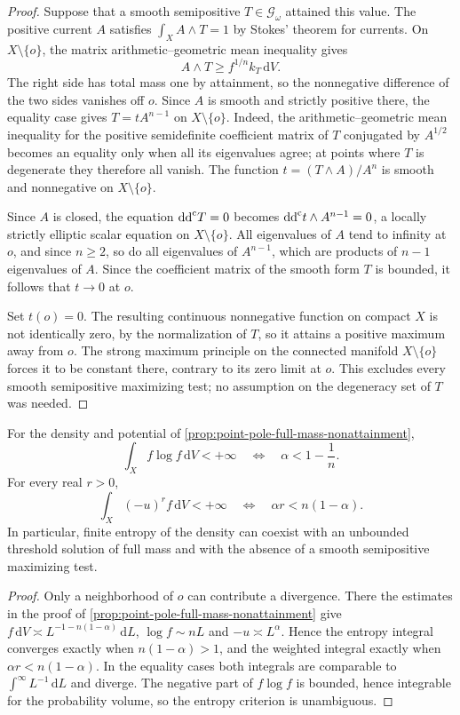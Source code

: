 \begin{proof}
Suppose that a smooth semipositive $T\in\mathscr G_\omega$ attained this value. The positive current $A$ satisfies $\int_XA\wedge T=1$ by Stokes' theorem for currents. On $X\setminus\{o\}$, the matrix arithmetic--geometric mean inequality gives
\[
 A\wedge T\geq f^{1/n}k_T\,\mathrm{d}V.
\]
The right side has total mass one by attainment, so the nonnegative difference of the two sides vanishes off $o$. Since $A$ is smooth and strictly positive there, the equality case gives $T=tA^{n-1}$ on $X\setminus\{o\}$. Indeed, the arithmetic--geometric mean inequality for the positive semidefinite coefficient matrix of $T$ conjugated by $A^{1/2}$ becomes an equality only when all its eigenvalues agree; at points where $T$ is degenerate they therefore all vanish. The function $t=(T\wedge A)/A^n$ is smooth and nonnegative on $X\setminus\{o\}$.

Since $A$ is closed, the equation $\mathrm{dd}^{\mathrm{c}} T=0$ becomes $\mathrm{dd}^{\mathrm{c}} t\wedge A^{n-1}=0$, a locally strictly elliptic scalar equation on $X\setminus\{o\}$. All eigenvalues of $A$ tend to infinity at $o$, and since $n\geq2$, so do all eigenvalues of $A^{n-1}$, which are products of $n-1$ eigenvalues of $A$. Since the coefficient matrix of the smooth form $T$ is bounded, it follows that $t\to0$ at $o$.

Set $t(o)=0$. The resulting continuous nonnegative function on compact $X$ is not identically zero, by the normalization of $T$, so it attains a positive maximum away from $o$. The strong maximum principle on the connected manifold $X\setminus\{o\}$ forces it to be constant there, contrary to its zero limit at $o$. This excludes every smooth semipositive maximizing test; no assumption on the degeneracy set of $T$ was needed.
\end{proof}

\begin{corollary}\label{cor:point-pole-entropy-energy-threshold}
For the density and potential of \cref{prop:point-pole-full-mass-nonattainment},
\[
 \int_X f\log f\,\mathrm{d}V<+\infty
 \quad\Longleftrightarrow\quad \alpha<1-\frac1n.
\]
For every real $r>0$,
\[
 \int_X(-u)^r f\,\mathrm{d}V<+\infty
 \quad\Longleftrightarrow\quad \alpha r<n(1-\alpha).
\]
In particular, finite entropy of the density can coexist with an unbounded threshold solution of full mass and with the absence of a smooth semipositive maximizing test.
\end{corollary}
\begin{proof}
Only a neighborhood of $o$ can contribute a divergence. There the estimates in the proof of \cref{prop:point-pole-full-mass-nonattainment} give $f\,\mathrm{d}V\asymp L^{-1-n(1-\alpha)}\,\mathrm{d}L$, $\log f\sim nL$ and $-u\asymp L^\alpha$. Hence the entropy integral converges exactly when $n(1-\alpha)>1$, and the weighted integral exactly when $\alpha r<n(1-\alpha)$. In the equality cases both integrals are comparable to $\int^\infty L^{-1}\,\mathrm{d}L$ and diverge. The negative part of $f\log f$ is bounded, hence integrable for the probability volume, so the entropy criterion is unambiguous.
\end{proof}

